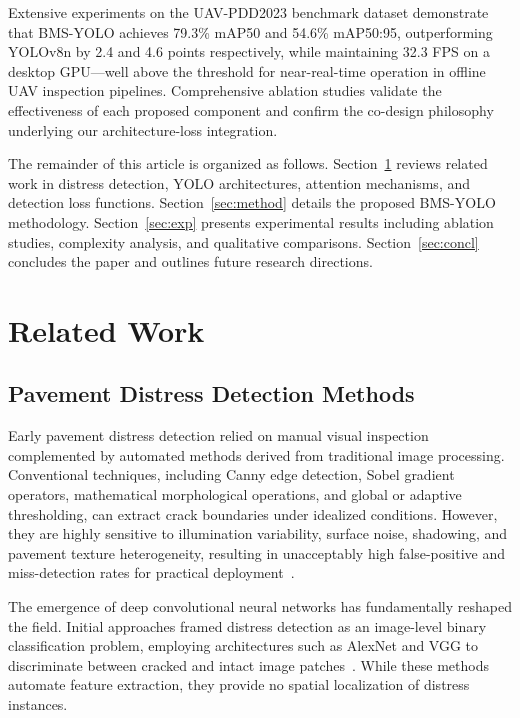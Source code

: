 \documentclass{ieeeaccess}
\begin{document}
Extensive experiments on the UAV-PDD2023 benchmark dataset demonstrate that BMS-YOLO achieves 79.3\% mAP50 and 54.6\% mAP50:95, outperforming YOLOv8n by 2.4 and 4.6 points respectively, while maintaining 32.3 FPS on a desktop GPU---well above the threshold for near-real-time operation in offline UAV inspection pipelines. Comprehensive ablation studies validate the effectiveness of each proposed component and confirm the co-design philosophy underlying our architecture-loss integration.

The remainder of this article is organized as follows. Section~\ref{sec:related} reviews related work in distress detection, YOLO architectures, attention mechanisms, and detection loss functions. Section~\ref{sec:method} details the proposed BMS-YOLO methodology. Section~\ref{sec:exp} presents experimental results including ablation studies, complexity analysis, and qualitative comparisons. Section~\ref{sec:concl} concludes the paper and outlines future research directions.

\section{Related Work}
\label{sec:related}

\subsection{Pavement Distress Detection Methods}

Early pavement distress detection relied on manual visual inspection complemented by automated methods derived from traditional image processing. Conventional techniques, including Canny edge detection, Sobel gradient operators, mathematical morphological operations, and global or adaptive thresholding, can extract crack boundaries under idealized conditions. However, they are highly sensitive to illumination variability, surface noise, shadowing, and pavement texture heterogeneity, resulting in unacceptably high false-positive and miss-detection rates for practical deployment~\cite{samadzadegan2024uavyolo}.

The emergence of deep convolutional neural networks has fundamentally reshaped the field. Initial approaches framed distress detection as an image-level binary classification problem, employing architectures such as AlexNet and VGG to discriminate between cracked and intact image patches~\cite{yang2025yolocompare}. While these methods automate feature extraction, they provide no spatial localization of distress instances.
\end{document}
